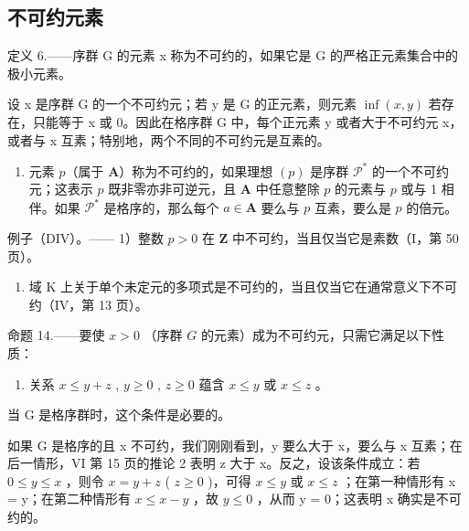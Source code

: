 \subsection{不可约元素}

定义 6.——序群 G 的元素 x 称为不可约的，如果它是 G 的严格正元素集合中的极小元素。

设 x 是序群 G 的一个不可约元；若 y 是 G 的正元素，则元素 \(\inf(x, y)\) 若存在，只能等于 x 或 0。因此在格序群 G 中，每个正元素 y 或者大于不可约元 x，或者与 x 互素；特别地，两个不同的不可约元是互素的。

\begin{enumerate}
\def\labelenumi{(\Roman{enumi})}
\setcounter{enumi}{503}
\tightlist
\item
  元素 \(p\)（属于 \(\mathbf{A}\)）称为不可约的，如果理想 \((p)\) 是序群 \(\mathcal{P}^*\) 的一个不可约元；这表示 \(p\) 既非零亦非可逆元，且 \(\mathbf{A}\) 中任意整除 \(p\) 的元素与 \(p\) 或与 1 相伴。如果 \(\mathcal{P}^*\) 是格序的，那么每个 \(a \in \mathbf{A}\) 要么与 \(p\) 互素，要么是 \(p\) 的倍元。
\end{enumerate}

例子（DIV）。—— 1）整数 \(p > 0\) 在 \(\mathbf{Z}\) 中不可约，当且仅当它是素数（I，第 50 页）。

\begin{enumerate}
\def\labelenumi{\arabic{enumi})}
\setcounter{enumi}{1}
\tightlist
\item
  域 K 上关于单个未定元的多项式是不可约的，当且仅当它在通常意义下不可约（IV，第 13 页）。
\end{enumerate}

命题 14.——要使 \(x > 0\) （序群 \(G\) 的元素）成为不可约元，只需它满足以下性质：

\begin{enumerate}
\def\labelenumi{(\Alph{enumi})}
\setcounter{enumi}{15}
\tightlist
\item
  关系 \(x \leqslant y + z\) , \(y \geqslant 0\) , \(z \geqslant 0\) 蕴含 \(x \leqslant y\) 或 \(x \leqslant z\) 。
\end{enumerate}

当 G 是格序群时，这个条件是必要的。

如果 G 是格序的且 x 不可约，我们刚刚看到，y 要么大于 x，要么与 x 互素；在后一情形，VI 第 15 页的推论 2 表明 z 大于 x。反之，设该条件成立：若 \(0 \leqslant y \leqslant x\) ，则令 \(x = y + z\) ( \(z \geqslant 0\) )，可得 \(x \leqslant y\) 或 \(x \leqslant z\) ；在第一种情形有 x = y；在第二种情形有 \(x \leqslant x - y\) ，故 \(y \leqslant 0\) ，从而 y = 0；这表明 x 确实是不可约的。

